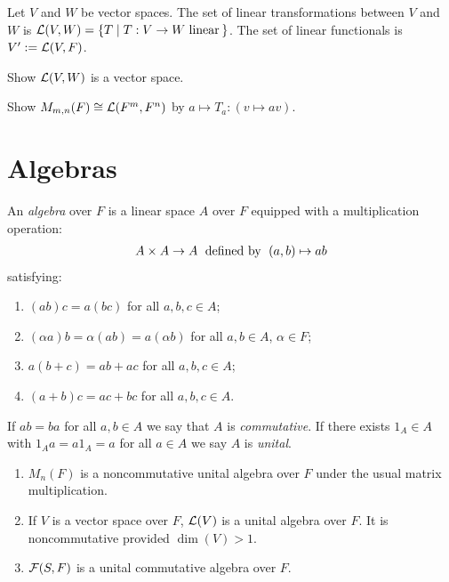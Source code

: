     \begin{definition}
        Let $V$ and $W$ be vector spaces. The set of linear transformations between $V$ and $W$ is $\mathcal{L}(V,W) = \{T \mid T:V \rightarrow W \hspace{3pt}\text{linear}\hspace{2pt}\}$. The set of linear functionals is $V' := \mathcal{L}(V,F)$.
    \end{definition}

    \begin{exercise}
        Show $\mathcal{L}(V,W)$ is a vector space.
    \end{exercise}
    
    \begin{exercise}
        Show $M_{m,n}(F) \cong \mathcal{L}(F^m,F^n)$ by $a \mapsto T_a:(v \mapsto av)$.
    \end{exercise}

\section{Algebras}
    \begin{definition}
        An \textit{algebra} over $F$ is a linear space $A$ over $F$ equipped with a multiplication operation:
            \begin{equation*}
            \begin{split}
                A \times A \rightarrow A \hspace{6pt}\text{defined by}\hspace{6pt} (a,b) \mapsto ab
            \end{split}
            \end{equation*}
        satisfying:
            \begin{enumerate}[label = (\arabic*),itemsep=1pt,topsep=3pt]
                \item $(ab)c = a(bc)$ for all $a,b,c \in A$;
                \item $(\alpha a)b = \alpha(ab) = a (\alpha b)$ for all $a,b \in A$, $\alpha \in F$;
                \item $a(b+c) = ab + ac$ for all $a,b,c \in A$;
                \item $(a+b)c = ac + bc$ for all $a,b,c \in A$.
            \end{enumerate}
        If $ab=ba$ for all $a,b \in A$ we say that $A$ is \textit{commutative}. If there exists $1_A \in A$ with $1_A a = a 1_A = a$ for all $a \in A$ we say $A$ is \textit{unital}.
    \end{definition}

    \begin{example}
        \phantom{a}
        \begin{enumerate}[label = (\arabic*),itemsep=1pt,topsep=3pt]
            \item $M_n(F)$ is a noncommutative unital algebra over $F$ under the usual matrix multiplication.
            \item If $V$ is a vector space over $F$, $\mathcal{L}(V)$ is a unital algebra over $F$. It is noncommutative provided $\dim(V) > 1$.
            \item $\mathcal{F}(S,F)$ is a unital commutative algebra over $F$.
        \end{enumerate}
    \end{example}

